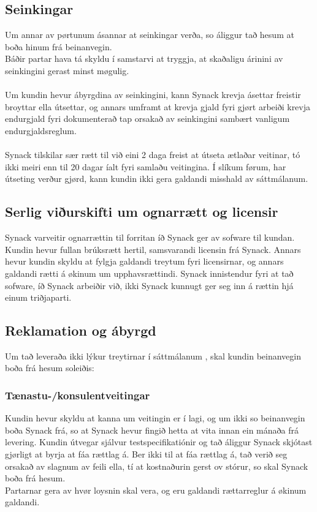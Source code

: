 \subsection{Seinkingar}
Um annar av pørtunum ásannar at seinkingar verða, so áliggur tað hesum at boða hinum frá beinanvegin. \\
Báðir partar hava tá skyldu í samstarvi at tryggja, at skaðaligu árinini av seinkingini gerast minst møgulig. \\ \\
Um kundin hevur ábyrgdina av seinkingini, kann Synack krevja ásettar freistir broyttar ella útsettar, og annars umframt at krevja gjald fyri gjørt arbeiði krevja endurgjald fyri dokumenterað tap orsakað av seinkingini sambært vanligum endurgjaldsreglum. \\ \\
Synack tilskilar sær rætt til við eini 2 daga freist at útseta ætlaðar veitinar, tó ikki meiri enn til 20 dagar íalt fyri samlaðu veitingina. Í slíkum førum, har útseting verður gjørd, kann kundin ikki gera galdandi misshald av sáttmálanum.

\subsection{Serlig viðurskifti um ognarrætt og licensir}
Synack varveitir ognarrættin til forritan íð Synack ger av sofware til kundan. Kundin hevur fullan brúksrætt hertil, samsvarandi licensin frá Synack. Annars hevur kundin skyldu at fylgja galdandi treytum fyri licensirnar, og annars galdandi rætti á økinum um upphavsrættindi. Synack innistendur fyri at tað sofware, íð Synack arbeiðir við, ikki Synack kunnugt ger seg inn á rættin hjá einum triðjaparti.

\subsection{Reklamation og ábyrgd}
Um tað leveraða ikki lýkur treytirnar í sáttmálanum , skal kundin beinanvegin boða frá hesum soleiðis:

\subsubsection*{Tænastu-/konsulentveitingar}
Kundin hevur skyldu at kanna um veitingin er í lagi, og um ikki so beinanvegin boða Synack frá, so at Synack hevur fingið hetta at vita innan ein mánaða frá levering. Kundin útvegar sjálvur testspecifikatiónir og tað áliggur Synack skjótast gjørligt at byrja at fáa rættlag á. Ber ikki til at fáa rættlag á, tað verið seg orsakað av slagnum av feili ella, tí at kostnaðurin gerst ov stórur, so skal Synack boða frá hesum. \\
Partarnar gera av hvør loysnin skal vera, og eru galdandi rættarreglur á økinum galdandi.

